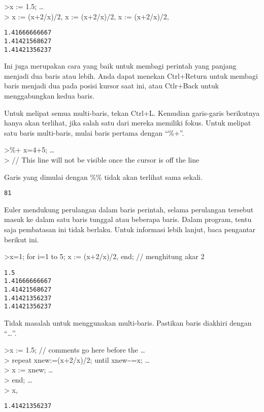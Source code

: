 \documentclass[
]{book}
\begin{document}
\textgreater x := 1.5; \ldots{}\\
\textgreater{} x := (x+2/x)/2, x := (x+2/x)/2, x := (x+2/x)/2,

\begin{verbatim}
1.41666666667
1.41421568627
1.41421356237
\end{verbatim}

Ini juga merupakan cara yang baik untuk membagi perintah yang panjang menjadi dua baris atau lebih. Anda dapat menekan Ctrl+Return untuk membagi baris menjadi dua pada posisi kursor saat ini, atau Ctlr+Back untuk menggabungkan kedua baris.

Untuk melipat semua multi-baris, tekan Ctrl+L. Kemudian garis-garis berikutnya hanya akan terlihat, jika salah satu dari mereka memiliki fokus. Untuk melipat satu baris multi-baris, mulai baris pertama dengan ``\%+''.

\textgreater\%+ x=4+5; \ldots{}\\
\textgreater{} // This line will not be visible once the cursor is off the line

Garis yang dimulai dengan \%\% tidak akan terlihat sama sekali.

\begin{verbatim}
81
\end{verbatim}

Euler mendukung perulangan dalam baris perintah, selama perulangan tersebut masuk ke dalam satu baris tunggal atau beberapa baris. Dalam program, tentu saja pembatasan ini tidak berlaku. Untuk informasi lebih lanjut, baca pengantar berikut ini.

\textgreater x=1; for i=1 to 5; x := (x+2/x)/2, end; // menghitung akar 2

\begin{verbatim}
1.5
1.41666666667
1.41421568627
1.41421356237
1.41421356237
\end{verbatim}

Tidak masalah untuk menggunakan multi-baris. Pastikan baris diakhiri dengan ``\ldots{}''.

\textgreater x := 1.5; // comments go here before the \ldots{}\\
\textgreater{} repeat xnew:=(x+2/x)/2; until xnew\textasciitilde=x; \ldots{}\\
\textgreater{} x := xnew; \ldots{}\\
\textgreater{} end; \ldots{}\\
\textgreater{} x,

\begin{verbatim}
1.41421356237
\end{verbatim}
\end{document}
